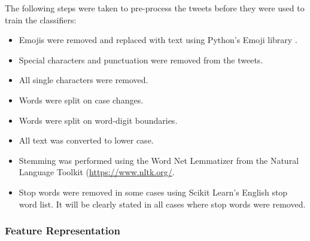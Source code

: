 The following steps were taken to pre-process the tweets before they were used to train the classifiers:
\begin{itemize}
    \item Emojis were removed and replaced with text using Python's Emoji library \cite{emoji}.
    \item Special characters and punctuation were removed from the tweets. 
    \item All single characters were removed.
    \item Words were split on case changes.
    \item Words were split on word-digit boundaries.
    \item All text was converted to lower case.
    \item Stemming was performed using the Word Net Lemmatizer from the Natural Language Toolkit (\url{https://www.nltk.org/}.
    \item Stop words were removed in some cases using Scikit Learn's English stop word list. It will be clearly stated in all cases where stop words were removed.
\end{itemize}

\subsubsection{Feature Representation}

